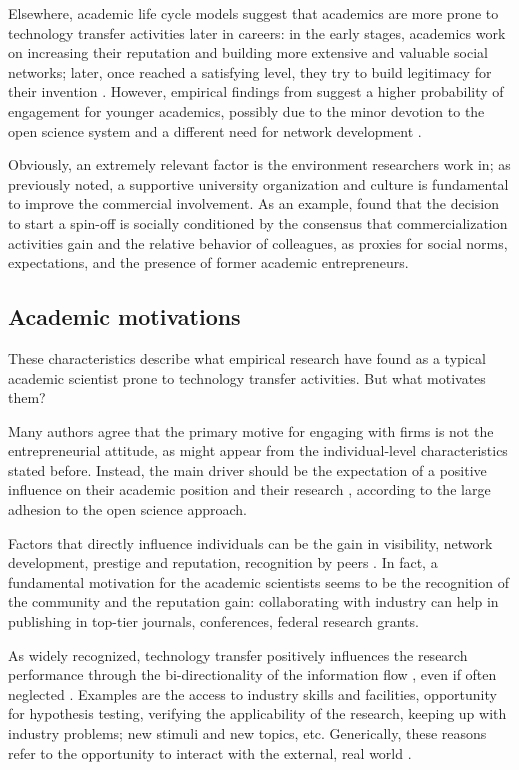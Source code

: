 Elsewhere, academic life cycle models suggest that academics are more prone to technology transfer activities later in careers: in the early stages, academics work on increasing their reputation and building more extensive and valuable social networks; later, once reached a satisfying level, they try to build legitimacy for their invention \citet{Fini2009}. However, empirical findings from \citet{DEste2007} suggest a higher probability of engagement for younger academics, possibly due to the minor devotion to the open science system and a different need for network development \citep{Bercovitz2006}.

Obviously, an extremely relevant factor is the environment researchers work in; as previously noted, a supportive university organization and culture is fundamental to improve the commercial involvement. As an example, \citet{OShea2004} found that the decision to start a spin-off is socially conditioned by the consensus that commercialization activities gain and the relative behavior of colleagues, as proxies for social norms, expectations, and the presence of former academic entrepreneurs. 

\subsection{Academic motivations}

These characteristics describe what empirical research have found as a typical academic scientist prone to technology transfer activities. But what motivates them? 

Many authors agree that the primary motive for engaging with firms is not the entrepreneurial attitude, as might appear from the individual-level characteristics stated before. Instead, the main driver should be the expectation of a positive influence on their academic position and their research \citep{Fini2009, DEste2011}, according to the large adhesion to the open science approach.

Factors that directly influence individuals can be the gain in visibility, network development, prestige and reputation, recognition by peers \citep{Baldini2007, Fini2009, Rizzo2015}. In fact, a fundamental motivation for the academic scientists seems to be the recognition of the community and the reputation gain: collaborating with industry can help in publishing in top-tier journals, conferences, federal research grants.

As widely recognized, technology transfer positively influences the research performance through the bi-directionality of the information flow \citep{Geuna2009}, even if often neglected \citep{DEste2007}. Examples are the access to industry skills and facilities, opportunity for hypothesis testing, verifying the applicability of the research, keeping up with industry problems; new stimuli and new topics, etc. Generically, these reasons refer to the opportunity to interact with the external, real world \citep{Baldini2007}. 

